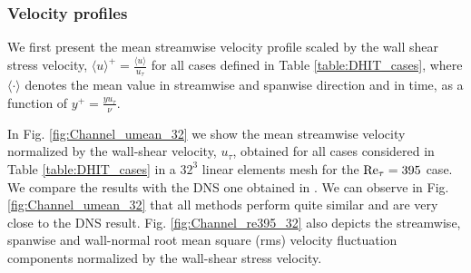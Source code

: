 \subsubsection{Velocity profiles}
We first present the mean streamwise velocity profile scaled by the wall shear stress velocity, $\langle u\rangle^+=\frac{\langle u\rangle}{u_\tau}$ for all cases defined in Table \ref{table:DHIT_cases}, where $\langle\cdot\rangle$  denotes the mean value in streamwise and spanwise direction and in time, as a function of $y^+ = \frac{y u_\tau}{\nu}$.

In Fig. \ref{fig:Channel_umean_32} we show the mean streamwise velocity normalized by the wall-shear velocity, $u_\tau$, obtained for all cases considered in Table \ref{table:DHIT_cases} in a $32^3$ linear elements mesh for the ${\rm Re}_\tau=395$ case. We compare the results with the DNS one obtained in  \cite{moser_direct_1999}. We can observe in Fig. \ref{fig:Channel_umean_32} that all methods perform quite similar and are very close to the DNS result. Fig. \ref{fig:Channel_re395_32} also depicts the streamwise, spanwise and wall-normal root mean square (rms) velocity fluctuation components normalized by the wall-shear stress velocity. 

